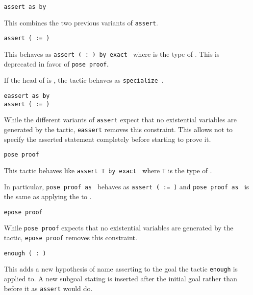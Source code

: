 \begin{coq_example*}
\begin{Variants}
\item \texttt{assert {\form} as {\intropattern} by {\tac}}

  This combines the two previous variants of {\tt assert}.

\item{\tt assert ( {\ident} := {\term} )}

  This behaves as {\tt assert ({\ident} :\ {\type}) by exact {\term}}
  where {\type} is the type of {\term}. This is deprecated in favor of
  {\tt pose proof}.

  If the head of {\term} is {\ident}, the tactic behaves as
  {\tt specialize \term}.

  \ErrMsg {}

\item \texttt{eassert {\form} as {\intropattern} by {\tac}}\\
  {\tt assert ( {\ident} := {\term} )}

  While the different variants of \texttt{assert} expect that no
  existential variables are generated by the tactic, \texttt{eassert}
  removes this constraint. This allows not to specify the asserted
  statement completely before starting to prove it.

\item \texttt{pose proof {\term} }

  This tactic behaves like \texttt{assert T  by
  exact {\term}} where \texttt{T} is the type of {\term}.

  In particular, \texttt{pose proof {\term} as {\ident}} behaves as
  \texttt{assert ({\ident} := {\term})} and \texttt{pose proof {\term}
    as {\intropattern}} is the same as applying
  the {\intropattern} to {\term}.

\item \texttt{epose proof {\term} }

  While \texttt{pose proof} expects that no existential variables are generated by the tactic,
  \texttt{epose proof} removes this constraint.

\item \texttt{enough ({\ident} :\ {\form})}

  This adds a new hypothesis of name {\ident} asserting {\form} to the
  goal the tactic \texttt{enough} is applied to. A new subgoal stating
  \texttt{\form} is inserted after the initial goal rather than before
  it as \texttt{assert} would do.


\end{Variants}
\end{coq_example*}
